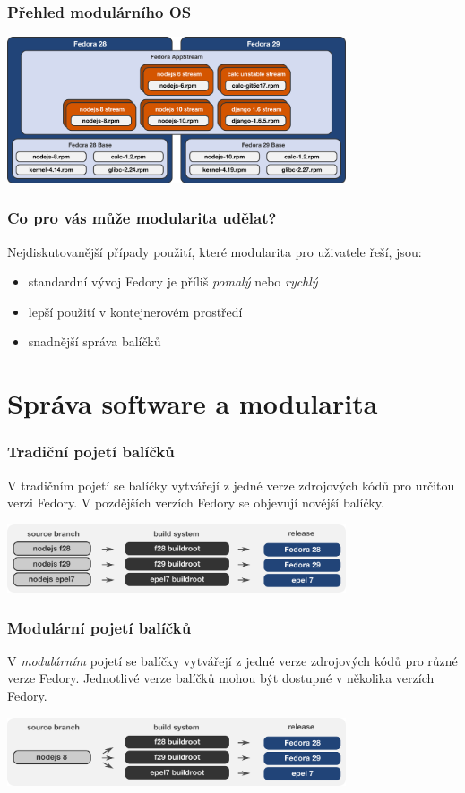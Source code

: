 \documentclass[12pt]{beamer}
\begin{document}
\begin{frame}
\frametitle{Přehled modulárního OS}

\begin{center}
	\includegraphics[width=10cm]{overview}
\end{center}
\end{frame}

\begin{frame}
\frametitle{Co pro vás může modularita udělat?}
Nejdiskutovanější případy použití, které modularita pro uživatele řeší, jsou:

\vspace{5pt}

\begin{itemize}
	\item standardní vývoj Fedory je příliš \textit{pomalý} nebo \textit{rychlý}
	\item lepší použití v kontejnerovém prostředí
	\item snadnější správa balíčků
\end{itemize}
\end{frame}

\section{Správa software a modularita}

\begin{frame}
\frametitle{Tradiční pojetí balíčků}
V tradičním pojetí se balíčky vytvářejí z jedné verze zdrojových kódů pro určitou verzi Fedory. V pozdějších verzích Fedory se objevují novější balíčky.
\begin{center}
	\includegraphics[width=10cm]{traditional}
\end{center}
\end{frame}

\begin{frame}
\frametitle{Modulární pojetí balíčků}
V \textit{modulárním} pojetí se balíčky vytvářejí z jedné verze zdrojových kódů pro různé verze Fedory. Jednotlivé verze balíčků mohou být dostupné v několika verzích Fedory.
\begin{center}
	\includegraphics[width=10cm]{modular}
\end{center}
\end{frame}
\end{document}
